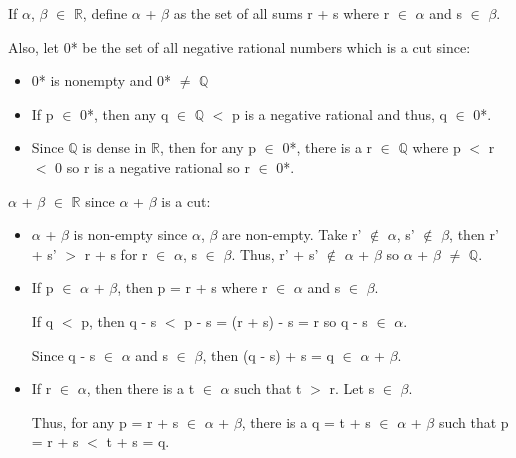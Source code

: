 	\begin{adjustbox}{minipage=14cm, right, vspace=0.1cm 0cm}
		If $\alpha$, $\beta$ $\in$ $\mathbb{R}$, define $\alpha$ + $\beta$ as the set of all
		sums r + s where r $\in$ $\alpha$ and s $\in$ $\beta$.

		Also, let 0* be the set of all negative rational numbers which is a cut since:
		
			\begin{itemize}[leftmargin=1cm, itemsep=0.4em]
				\item 0* is nonempty and 0* $\not =$ $\mathbb{Q}$

				\item If p $\in$ 0*, then any q $\in$ $\mathbb{Q}$ $<$ p is a negative rational
					and thus, q $\in$ 0*.

				\item Since $\mathbb{Q}$ is dense in $\mathbb{R}$, then for any p $\in$ 0*,
					there is a r $\in$ $\mathbb{Q}$ where p $<$ r $<$ 0 so r is a
					negative rational so r $\in$ 0*.
			\end{itemize}

		$\alpha$ + $\beta$ $\in$ $\mathbb{R}$ since $\alpha$ + $\beta$ is a cut:

			\begin{itemize}[leftmargin=1cm, itemsep=0.4em]
				\item $\alpha$ + $\beta$ is non-empty since $\alpha$, $\beta$ are non-empty.
					Take r' $\not \in$ $\alpha$, s' $\not \in$ $\beta$, then
					r' + s' $>$ r + s for r $\in$ $\alpha$, s $\in$ $\beta$.
					Thus, r' + s' $\not \in$ $\alpha$ + $\beta$ so
					$\alpha$ + $\beta$ $\neq$ $\mathbb{Q}$.

				\item If p $\in$ $\alpha$ + $\beta$, then p = r + s where r $\in$ $\alpha$
					and s $\in$ $\beta$.

					If q $<$ p, then q - s $<$ p - s = (r + s) - s = r so q - s $\in$ $\alpha$.

					Since q - s $\in$ $\alpha$ and s $\in$ $\beta$, then
					(q - s) + s = q $\in$ $\alpha$ + $\beta$.

				\item If r $\in$ $\alpha$, then there is a t $\in$ $\alpha$ such that t $>$ r.
					Let s $\in$ $\beta$.

					Thus, for any p = r + s $\in$ $\alpha$ + $\beta$, there is a
					q = t + s $\in$ $\alpha$ + $\beta$ such that p = r + s $<$ t + s = q.
			\end{itemize}


\end{adjustbox}
